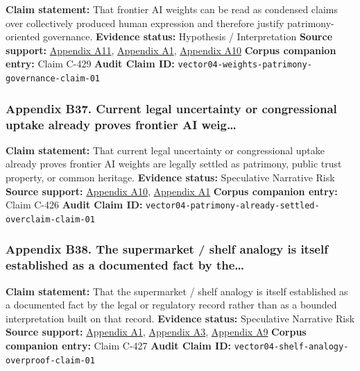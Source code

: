 \documentclass[
  american,
  11pt,
  letterpaper,
]{article}
\begin{document}
\textbf{Claim statement:} That frontier AI weights can be read as
condensed claims over collectively produced human expression and
therefore justify patrimony-oriented governance. \textbf{Evidence
status:} Hypothesis / Interpretation \textbf{Source support:}
\hyperref[appendix-a11-ai-copyright-weights-a-new-frontier-in-intellectual-property-law]{Appendix
A11},
\hyperref[appendix-a1-copyright-and-artificial-intelligence-part-3-generative-ai-training-pre-publication-version]{Appendix
A1},
\hyperref[appendix-a10-bipartisan-house-task-force-report-on-artificial-intelligence]{Appendix
A10} \textbf{Corpus companion entry:} Claim C-429 \textbf{Audit Claim
ID:} \texttt{vector04-weights-patrimony-governance-claim-01}

\subsubsection{Appendix B37. Current legal uncertainty or congressional
uptake already proves frontier AI
weig\ldots{}}\label{appendix-b37-current-legal-uncertainty-or-congressional-uptake-already-proves-frontier-ai-weig}

\textbf{Claim statement:} That current legal uncertainty or
congressional uptake already proves frontier AI weights are legally
settled as patrimony, public trust property, or common heritage.
\textbf{Evidence status:} Speculative Narrative Risk \textbf{Source
support:}
\hyperref[appendix-a10-bipartisan-house-task-force-report-on-artificial-intelligence]{Appendix
A10},
\hyperref[appendix-a1-copyright-and-artificial-intelligence-part-3-generative-ai-training-pre-publication-version]{Appendix
A1} \textbf{Corpus companion entry:} Claim C-426 \textbf{Audit Claim
ID:} \texttt{vector04-patrimony-already-settled-overclaim-claim-01}

\subsubsection{Appendix B38. The supermarket / shelf analogy is itself
established as a documented fact by
the\ldots{}}\label{appendix-b38-the-supermarket-shelf-analogy-is-itself-established-as-a-documented-fact-by-the}

\textbf{Claim statement:} That the supermarket / shelf analogy is itself
established as a documented fact by the legal or regulatory record
rather than as a bounded interpretation built on that record.
\textbf{Evidence status:} Speculative Narrative Risk \textbf{Source
support:}
\hyperref[appendix-a1-copyright-and-artificial-intelligence-part-3-generative-ai-training-pre-publication-version]{Appendix
A1},
\hyperref[appendix-a3-reddit-strikes-60m-deal-allowing-google-to-train-ai-models-on-its-posts-unveils-ipo-plans]{Appendix
A3},
\hyperref[appendix-a9-the-problem-with-annotation-human-labour-and-outsourcing-between-france-and-madagascar]{Appendix
A9} \textbf{Corpus companion entry:} Claim C-427 \textbf{Audit Claim
ID:} \texttt{vector04-shelf-analogy-overproof-claim-01}
\end{document}
